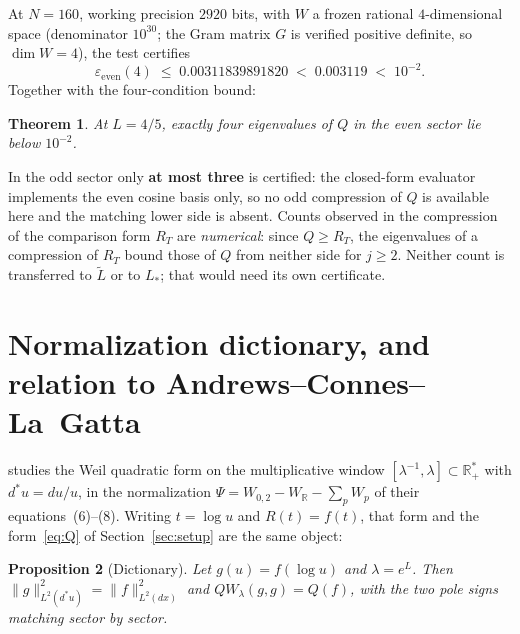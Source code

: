 \documentclass[11pt,a4paper]{article}
\newtheorem{theorem}{Theorem}
\newtheorem{proposition}[theorem]{Proposition}
\theoremstyle{definition}
\theoremstyle{remark}
\begin{document}
At $N = 160$, working precision $2920$ bits, with $W$ a frozen rational
$4$-dimensional space (denominator $10^{30}$; the Gram matrix $G$ is verified
positive definite, so $\dim W = 4$), the test certifies
\[
   \varepsilon_{\mathrm{even}}(4) \;\le\; 0.00311839891820
   \;<\; 0.003119 \;<\; 10^{-2} .
\]
Together with the four-condition bound:

\begin{theorem}
\label{thm:exactly4}
At $L = 4/5$, exactly four eigenvalues of $Q$ in the even sector lie below
$10^{-2}$.
\end{theorem}

In the odd sector only \textbf{at most three} is certified: the closed-form
evaluator implements the even cosine basis only, so no odd compression of $Q$ is
available here and the matching lower side is absent. Counts observed in the
compression of the comparison form $R_T$ are \emph{numerical}: since
$Q \ge R_T$, the eigenvalues of a compression of $R_T$ bound those of $Q$ from
neither side for $j \ge 2$. Neither count is transferred to $\widetilde L$ or to
$L_\ast$; that would need its own certificate.

\section{Normalization dictionary, and relation to Andrews--Connes--La~Gatta}
\label{sec:dict}

\cite{ACLG} studies the Weil quadratic form on the multiplicative window
$[\lambda^{-1},\lambda] \subset \mathbb{R}^\ast_+$ with $d^\ast u = du/u$, in the
normalization $\Psi = W_{0,2} - W_{\mathbb{R}} - \sum_p W_p$ of their
equations~(6)--(8). Writing $t = \log u$ and $R(t) = f(t)$, that form and the
form~\eqref{eq:Q} of Section~\ref{sec:setup} are the same object:

\begin{proposition}[Dictionary]
\label{prop:dict}
Let $g(u) = f(\log u)$ and $\lambda = e^{L}$. Then
$\|g\|^2_{L^2(d^\ast u)} = \|f\|^2_{L^2(dx)}$ and
$QW_\lambda(g,g) = Q(f)$, with the two pole signs matching sector by sector.
\end{proposition}
\end{document}
